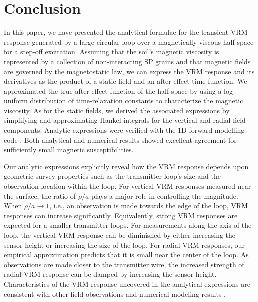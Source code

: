 \documentclass[onecolumn]{IEEEtran} %
\begin{document}

\section{Conclusion}
In this paper, we have presented the analytical formulae for the transient VRM response generated by a large circular loop over a magnetically viscous half-space for a step-off excitation. Assuming that the soil's magnetic viscosity is represented by a collection of non-interacting SP grains \citep{Neel1949} and that magnetic fields are governed by the magnetostatic law, we can express the VRM response and its derivatives as the product of a static field and an after-effect time function. We approximated the true after-effect function of the half-space by using a log-uniform distribution of time-relaxation constants to characterize the magnetic viscosity. As for the static fields, we derived the associated expressions by simplifying and approximating Hankel integrals for the vertical and radial field components. Analytic expressions were verified with the 1D forward modelling code \citep{EM1DTM}. Both analytical and numerical results showed excellent agreement for sufficiently small magnetic susceptibilities.

Our analytic expressions explicitly reveal how the VRM response depends upon geometric survey properties such as the transmitter loop's size and the observation location within the loop. For vertical VRM responses measured near the surface, the ratio of $\rho/a$ plays a major role in controlling the magnitude. When $\rho/a \rightarrow 1$, i.e., an observation is made towards the edge of the loop, VRM responses can increase significantly. Equivalently, strong VRM responses are expected for a smaller transmitter loops. For measurements along the axis of the loop, the vertical VRM response  can be diminished by either increasing the sensor height or increasing the size of the loop. For radial VRM responses, our empirical approximation predicts that it is small near the center of the loop. As observations are made closer to the transmitter wire, the increased strength of radial VRM response can be damped by increasing the sensor height. Characteristics of the VRM response uncovered in the analytical expressions are consistent with other field observations and numerical modeling results \citep{Buselli1982, Barsukov2001, Billings2003, Kozhevnikov2007,Pasion2007, Zadorozhnaya2012}.
\end{document}
